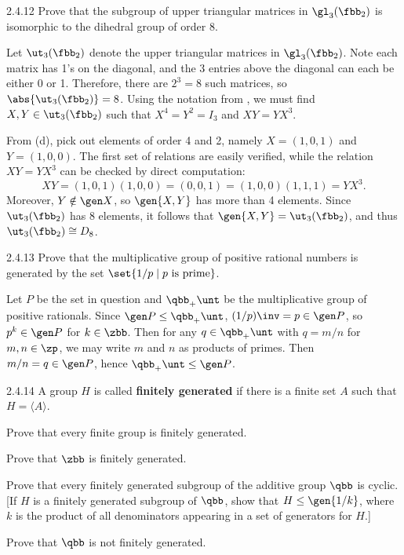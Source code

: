 \begin{exercise}{2.4.12}
    Prove that the subgroup of upper triangular matrices in $\gl_3(\fbb_2)$ is isomorphic to the dihedral group of order $8$.
    
\end{exercise}

\begin{sol}
    Let $\ut_3(\fbb_2)$ denote the upper triangular matrices in $\gl_3(\fbb_2)$.
	Note each matrix has 1's on the diagonal, and the 3 entries above the diagonal can each be either 0 or 1.
	Therefore, there are $2^3 = 8$ such matrices, so $\abs{\ut_3(\fbb_2)} = 8$.
	Using the notation from , we must find $X, Y \in \ut_3(\fbb_2)$ such that $X^4 = Y^2 = I_3$ and $XY = YX^3$.

    From  (d), pick out elements of order 4 and 2, namely $X = (1, 0, 1)$ and $Y = (1, 0, 0)$.
	The first set of relations are easily verified, while the relation $XY = YX^3$ can be checked by direct computation:
    \[
    	XY = (1, 0, 1)(1, 0, 0) = (0, 0, 1) = (1, 0, 0)(1, 1, 1) = YX^3.
    \]
    Moreover, $Y \notin \gen X$, so $\gen{X, Y}$ has more than 4 elements.
	Since $\ut_3(\fbb_2)$ has 8 elements, it follows that $\gen{X, Y} = \ut_3(\fbb_2)$, and thus $\ut_3(\fbb_2) \cong D_8$.
\end{sol}

\begin{exercise}{2.4.13}
    Prove that the multiplicative group of positive rational numbers is generated by the set $\set{1/p \mid p \text{ is prime}}$.
\end{exercise}

\begin{sol}
    Let $P$ be the set in question and $\qbb_+\unt$ be the multiplicative group of positive rationals.
	Since $\gen P \leq \qbb_+\unt$, $(1 / p)\inv = p \in \gen P$, so $p^k \in \gen P$ for $k \in \zbb$.
	Then for any $q \in \qbb_+\unt$ with $q = m/n$ for $m, n \in \zp$, we may write $m$ and $n$ as products of primes.
	Then $m/n = q \in \gen P$, hence $\qbb_+\unt \leq \gen P$.
\end{sol}

\begin{spex}{2.4.14}
    A group $H$ is called \textbf{finitely generated} if there is a finite set $A$ such that $H=\langle A\rangle$.
    \begin{subexercises}
        \item Prove that every finite group is finitely generated.
        \item Prove that $\zbb$ is finitely generated.
        \item Prove that every finitely generated subgroup of the additive group $\qbb$ is cyclic. [If $H$ is a finitely generated subgroup of $\qbb$, show that $H \leq \gen{1/k}$, where $k$ is the product of all denominators appearing in a set of generators for $H$.]
        \item Prove that $\qbb$ is not finitely generated.
    \end{subexercises}
\end{spex}

